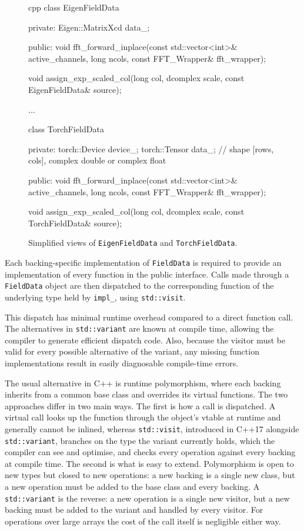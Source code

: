 \begin{figure}
\begin{code}{cpp}
class EigenFieldData {
private:
    Eigen::MatrixXcd data_;

public:
    void fft_forward_inplace(const std::vector<int>& active_channels, long ncols, const FFT_Wrapper& fft_wrapper);

    void assign_exp_scaled_col(long col, dcomplex scale, const EigenFieldData& source);

    ...
}

class TorchFieldData {
private:
    torch::Device device_;
    torch::Tensor data_; // shape [rows, cols], complex double or complex float
    
public:
    void fft_forward_inplace(const std::vector<int>& active_channels, long ncols, const FFT_Wrapper& fft_wrapper);

    void assign_exp_scaled_col(long col, dcomplex scale, const TorchFieldData& source);
}
\end{code}
  \caption{Simplified views of \texttt{EigenFieldData} and \texttt{TorchFieldData}.}
  \label{fig:BackingSpecificFieldData}
\end{figure}

Each backing-specific implementation of \texttt{FieldData} is required to provide an implementation of every function in the public interface. 
Calls made through a \texttt{FieldData} object are then dispatched to the corresponding function of the underlying type held by \texttt{impl\_}, using \texttt{std::visit}.

This dispatch has minimal runtime overhead compared to a direct function call. The alternatives in \texttt{std::variant} are known at compile time, allowing the compiler to generate efficient dispatch code.
Also, because the visitor must be valid for every possible alternative of the variant,
any missing function implementations result in easily diagnosable compile-time errors.

The usual alternative in C++ is runtime polymorphism, where each backing inherits from a common base class and overrides its virtual functions.
The two approaches differ in two main ways. The first is how a call is dispatched. A virtual call looks up the function through the object's vtable at runtime and generally cannot be inlined, whereas \texttt{std::visit}, introduced in C++17 alongside \texttt{std::variant}, branches on the type the variant currently holds, which the compiler can see and optimise, and checks every operation against every backing at compile time.
The second is what is easy to extend. Polymorphism is open to new types but closed to new operations: a new backing is a single new class, but a new operation must be added to the base class and every backing.
A \texttt{std::variant} is the reverse: a new operation is a single new visitor, but a new backing must be added to the variant and handled by every visitor.
For operations over large arrays the cost of the call itself is negligible either way.

